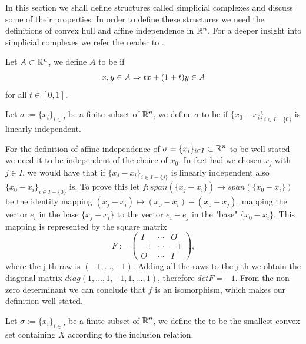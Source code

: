 \documentclass[../1.tex]{subfiles}
\begin{document}
    In this section we shall define structures called simplicial complexes and discuss some of their properties. In order to define these structures
    we need the definitions of convex hull and affine independence in $\mathbb{R}^n$. For a deeper insight into simplicial complexes we refer the reader to 
    \cite{singerthorpe,rotman}.    

    \begin{defn}
        Let $A \subset \mathbb{R}^n$, we define $A$ to be  if
        \[ x,y \in A \Rightarrow tx + (1+t)y \in A \]
        for all $t \in [0,1]$.
    \end{defn}

    \begin{defn}
        Let $\sigma := \{x_i\}_{i \in I}$ be a finite subset of $\mathbb{R}^n$, we define $\sigma$ to be  if 
        $\{ x_0 - x_i\}_{i \in I - \{0\}}$ is linearly independent.
    \end{defn}

    For the definition of affine independence of $\sigma = \{x_i\}_{i \in I} \subset \mathbb{R}^n$ to be well stated we need it to be independent of the choice of $x_0$.
    In fact had we chosen $x_j$ with $j \in I$, we would have that if $\{ x_j - x_i\}_{i \in I-\{j\}}$ is linearly independent also $\{ x_0 - x_i\}_{i \in I-\{0\}}$ is.
    To prove this let $f : span(\{ x_j - x_i\}) \to span(\{x_0 - x_i\})$ be the identity mapping $(x_j - x_i) \mapsto (x_0 - x_i) - (x_0 - x_j)$, mapping
    the vector $e_i$ in the base $\{ x_j - x_i\}$ to the vector $e_i - e_j$ in the "base" $\{x_0 - x_i\}$. This mapping is represented by the square matrix 
    \[
        F :=
        \begin{pmatrix}
            I & \cdots & O \\
            -1 & \cdots & -1\\
            O & \cdots & I
        \end{pmatrix},
    \]
    where the j-th raw is $(-1,...,-1)$.
    Adding all the raws to the j-th we obtain the diagonal matrix $diag(1,...,1,-1,1,...,1)$, therefore $detF = -1$.
    From the non-zero determinant we can conclude that $f$ is an isomorphism, which makes our definition well stated.

    \begin{defn}
        Let $\sigma := \{x_i\}_{i \in I}$ be a finite subset of $\mathbb{R}^n$, we define the  to be 
        the smallest convex set containing $X$ according to the inclusion relation.
    \end{defn}
\end{document}
